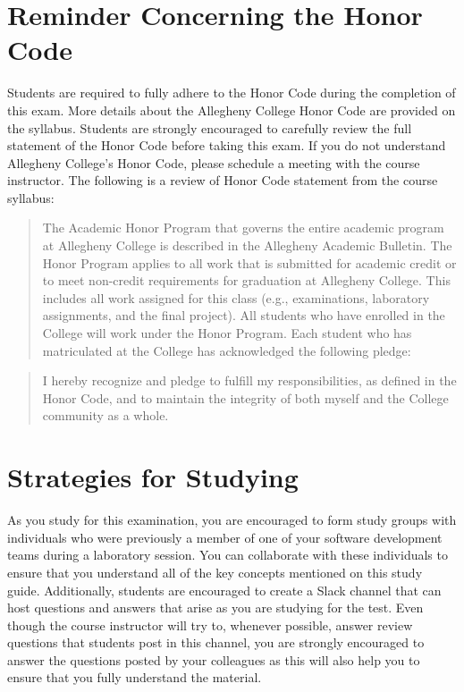 \documentclass[11pt]{article}
\begin{document}
\section*{Reminder Concerning the Honor Code}

\noindent Students are required to fully adhere to the Honor Code during the
completion of this exam. More details about the Allegheny College Honor Code are
provided on the syllabus. Students are strongly encouraged to carefully review
the full statement of the Honor Code before taking this exam. If you do not
understand Allegheny College's Honor Code, please schedule a meeting with the
course instructor. The following is a review of Honor Code statement from the
course syllabus:

\begin{quote}

  The Academic Honor Program that governs the entire academic program at
  Allegheny College is described in the Allegheny Academic Bulletin. The Honor
  Program applies to all work that is submitted for academic credit or to meet
  non-credit requirements for graduation at Allegheny College. This includes all
  work assigned for this class (e.g., examinations, laboratory assignments, and
  the final project). All students who have enrolled in the College will work
  under the Honor Program. Each student who has matriculated at the College has
  acknowledged the following pledge:

\end{quote}

\begin{quote}

  I hereby recognize and pledge to fulfill my responsibilities, as defined in
  the Honor Code, and to maintain the integrity of both myself and the College
  community as a whole.

\end{quote}

\section*{Strategies for Studying}

As you study for this examination, you are encouraged to form study groups with
individuals who were previously a member of one of your software development
teams during a laboratory session. You can collaborate with these individuals to
ensure that you understand all of the key concepts mentioned on this study
guide. Additionally, students are encouraged to create a Slack channel that can
host questions and answers that arise as you are studying for the test. Even
though the course instructor will try to, whenever possible, answer review
questions that students post in this channel, you are strongly encouraged to
answer the questions posted by your colleagues as this will also help you to
ensure that you fully understand the material.
\end{document}
